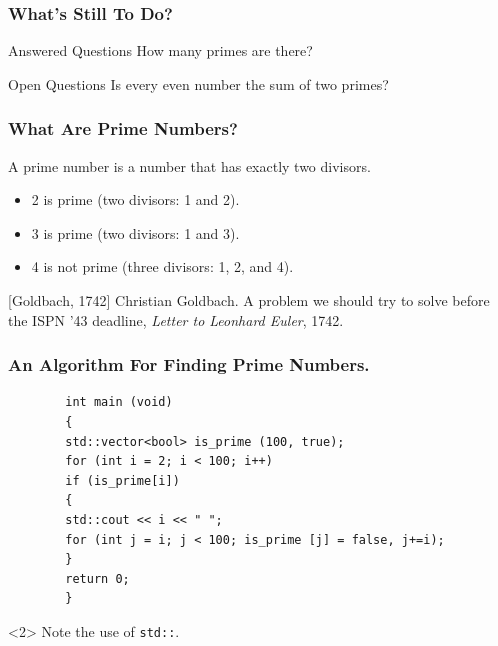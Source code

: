 \documentclass[aspectratio=169]{beamer}
\begin{document}
\begin{frame}
    \frametitle{What’s Still To Do?}
    \begin{block}{Answered Questions}
    How many primes are there?
    \end{block}
    \begin{block}{Open Questions}
    Is every even number the sum of two primes?
    \end{block}
\end{frame}

\begin{frame}[t]
    \frametitle{What Are Prime Numbers?}
    \begin{definition}
    A \alert{prime number} is a number that has exactly two divisors.
    \end{definition}
    \begin{example}
    \begin{itemize}
    \item 2 is prime (two divisors: 1 and 2).
    \item 3 is prime (two divisors: 1 and 3).
    \item 4 is not prime (\alert{three} divisors: 1, 2, and 4).
    \end{itemize}
    \end{example}
\end{frame}

\begin{thebibliography}{10}
    [Goldbach, 1742]
    Christian Goldbach.
    \newblock A problem we should try to solve before the ISPN ’43 deadline,
    \newblock \emph{Letter to Leonhard Euler}, 1742.
\end{thebibliography}

    \begin{frame}[fragile]
        \frametitle{An Algorithm For Finding Prime Numbers.}
        \begin{verbatim}
        int main (void)
        {
        std::vector<bool> is_prime (100, true);
        for (int i = 2; i < 100; i++)
        if (is_prime[i])
        {
        std::cout << i << " ";
        for (int j = i; j < 100; is_prime [j] = false, j+=i);
        }
        return 0;
        }
        \end{verbatim}
        \begin{uncoverenv}<2>
        Note the use of \verb|std::|.
        \end{uncoverenv}
        
    
\end{frame}
\end{document}
